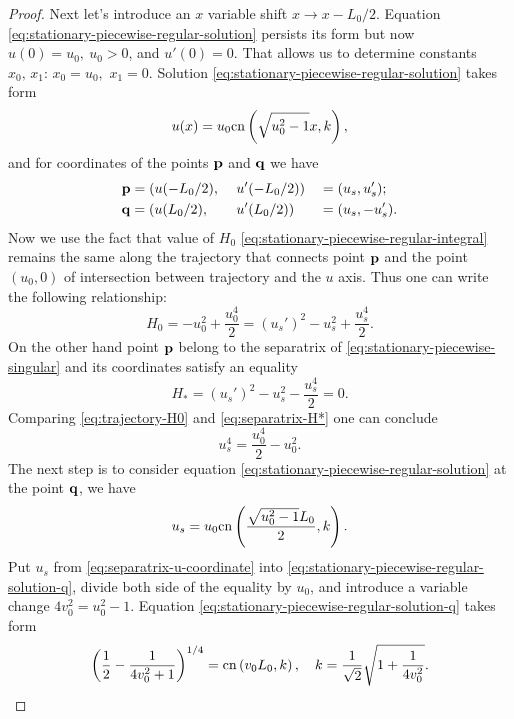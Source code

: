 \begin{proof}
	Next let's introduce an $x$ variable shift $x \to x - L_0 / 2$.
	Equation \eqref{eq:stationary-piecewise-regular-solution} persists its form but now $u(0) = u_0, \ u_0 > 0$, and $u'(0) = 0$.
	That allows us to determine constants $x_0, \, x_1$: $x_0 = u_0,$ $x_1 = 0$.
	Solution \eqref{eq:stationary-piecewise-regular-solution} takes form
	\begin{equation}
		u(x) = u_0 \mathrm{cn} \left( \sqrt{u_0^2 - 1} x, k \right),
	\label{eq:stationary-piecewise-regular-solution-shifted}
	\end{equation}
	and for coordinates of the points $\vb{p}$ and $\vb{q}$ we have
	\begin{alignat}{3}
		& \vb{p} = (u(-L_0 / 2), && \ u'(-L_0 / 2)) && = (u_s, u_s'); \label{eq:p-first-group} \\
		& \vb{q} = (u(L_0 / 2),  && \ u'(L_0 / 2)) && = (u_s, -u_s'). \label{eq:q-first-group}
    \end{alignat}
	Now we use the fact that value of $H_0$ \eqref{eq:stationary-piecewise-regular-integral} remains the same along the trajectory that connects point $\vb{p}$ and the point $(u_0, 0)$ of intersection between trajectory and the $u$ axis.
	Thus one can write the following relationship:
	\begin{equation}
		H_0 = -u_0^2 + \frac{u_0^4}{2} = (u_s')^2 - u_s^2 + \frac{u_s^4}{2}.
	\label{eq:trajectory-H0}
	\end{equation}
	On the other hand point $\vb{p}$ belong to the separatrix of \eqref{eq:stationary-piecewise-singular} and its coordinates satisfy an equality
	\begin{equation}
		H_* = (u_s')^2 - u_s^2 - \frac{u_s^4}{2} = 0.
	\label{eq:separatrix-H*}
	\end{equation}
	Comparing \eqref{eq:trajectory-H0} and \eqref{eq:separatrix-H*} one can conclude
	\begin{equation}
		u_s^4 = \frac{u_0^4}{2} - u_0^2.
	\label{eq:separatrix-u-coordinate}
	\end{equation}
	The next step is to consider equation \eqref{eq:stationary-piecewise-regular-solution} at the point $\vb{q}$, we have
	\begin{equation}
		u_s = u_0 \mathrm{cn} \left(\frac{\sqrt{u_0^2 - 1} L_0}{2}, k \right).
	\label{eq:stationary-piecewise-regular-solution-q}
	\end{equation}
	Put $u_s$ from \eqref{eq:separatrix-u-coordinate} into \eqref{eq:stationary-piecewise-regular-solution-q}, divide both side of the equality by $u_0$, and introduce a variable change $4 v_0^2 = u_0^2 - 1$.
	Equation \eqref{eq:stationary-piecewise-regular-solution-q} takes form
	\begin{equation}
		\left( \frac{1}{2} - \frac{1}{4 v_0^2 + 1} \right)^{1/4} = \mathrm{cn} \left( v_0 L_0, k \right), \quad k = \frac{1}{\sqrt{2}} \sqrt{1 + \frac{1}{4 v_0^2}}.
	\label{eq:v0-elliptic-relationship}
	\end{equation}
	

\end{proof}

